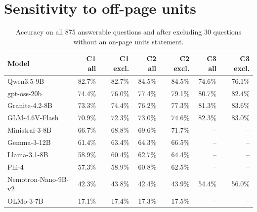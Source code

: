 \documentclass[11pt]{article}
\begin{document}
\section{Sensitivity to off-page units}\label{app:sens}
\begin{table}[H]\centering\footnotesize
\caption{Accuracy on all 875 answerable questions and after excluding 30 questions without an on-page units statement.}
\begin{tabular}{lrrrrrr}\toprule
Model & C1 all & C1 excl. & C2 all & C2 excl. & C3 all & C3 excl.\\\midrule
Qwen3.5-9B & 82.7\% & 82.7\% & 84.5\% & 84.5\% & 74.6\% & 76.1\%\\
gpt-oss-20b & 74.4\% & 76.0\% & 77.4\% & 79.1\% & 80.7\% & 82.4\%\\
Granite-4.2-8B & 73.3\% & 74.4\% & 76.2\% & 77.3\% & 81.3\% & 83.6\%\\
GLM-4.6V-Flash & 70.9\% & 72.3\% & 73.0\% & 74.6\% & 82.3\% & 83.0\%\\
Ministral-3-8B & 66.7\% & 68.8\% & 69.6\% & 71.7\% & -- & --\\
Gemma-3-12B & 61.4\% & 63.4\% & 64.3\% & 66.5\% & -- & --\\
Llama-3.1-8B & 58.9\% & 60.4\% & 62.7\% & 64.4\% & -- & --\\
Phi-4 & 57.3\% & 58.9\% & 60.8\% & 62.5\% & -- & --\\
Nemotron-Nano-9B-v2 & 42.3\% & 43.8\% & 42.4\% & 43.9\% & 54.4\% & 56.0\%\\
OLMo-3-7B & 17.1\% & 17.4\% & 17.3\% & 17.5\% & -- & --\\
\bottomrule\end{tabular}
\end{table}
\end{document}
